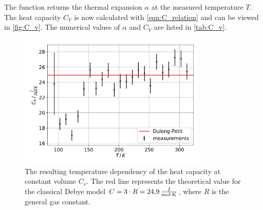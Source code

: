 The function returns the thermal expansion $\alpha$ at the measured temperature $T$.
The heat capacity $C_V$ is now calculated with \autoref{eqn:C_relation} and can be viewed in \autoref{fig:C_v}.
The numerical values of $\alpha$ and $C_V$ are listed in \autoref{tab:C_v}.
\begin{figure}
    \centering
    \includegraphics[width=0.8\textwidth]{content/plots/C_v.pdf}
    \caption{The resulting temperature dependency of the heat capacity at constant volume $C_v$.
    The red line represents the theoretical value for the classical Debye model $C = 3 \cdot R = \qty{24.9}{\frac{\joule}{\mol \cdot \kelvin}}$, where $R$ is the general gas constant.
    }
    \label{fig:C_v}
\end{figure}
